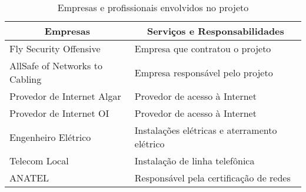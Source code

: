 \begin{table}[h!]
	\centering
	\renewcommand{\arraystretch}{2.0}
	\caption{Empresas e profissionais envolvidos no projeto}
	\label{tab1}
	\begin{tabular}{|l|l|}
		\hline
		\multicolumn{1}{|c|}{\textbf{Empresas}} &	 \multicolumn{1}{|c|}{\textbf{Serviços e Responsabilidades}}                                 		  \\ \hline		
		Fly Security Offensive                                
		& Empresa que contratou o projeto                                              \\ \hline
		AllSafe of Networks to Cabling                             
		& Empresa responsável pelo projeto                                              \\ \hline
		Provedor de Internet Algar                                
		& Provedor de acesso à Internet                                              \\ \hline
		Provedor de Internet OI                               
		& Provedor de acesso à Internet            					\\ \hline
		Engenheiro Elétrico                                  
		& Instalações elétricas e aterramento elétrico          \\ \hline
		Telecom Local                                        
		& Instalação de linha telefônica      \\ \hline
		ANATEL                                  
		& Responsável pela certificação de redes \\ \hline
	\end{tabular}
\end{table}